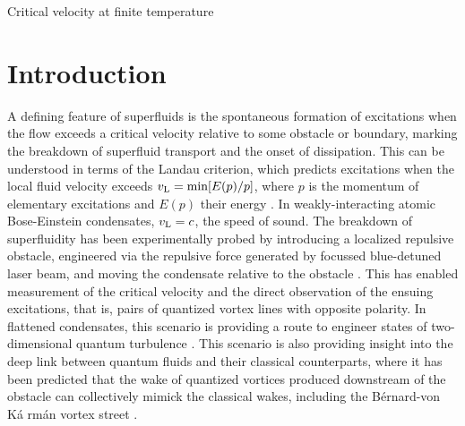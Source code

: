 \begin{chapter}{\label{cha:nonequib}Critical velocity at finite temperature}
  \section{Introduction}
A defining feature of superfluids is the spontaneous formation of excitations when the flow exceeds a critical velocity relative to some obstacle or boundary, marking the breakdown of superfluid transport and the onset of dissipation.  This can be understood in terms of the Landau criterion, which predicts excitations when the local fluid velocity exceeds $v_{\rm L} = \textrm{min} [E(p)/p]$, where $p$ is the momentum of elementary excitations and $E(p)$ their energy \cite{NozieresPines}.  In weakly-interacting atomic Bose-Einstein condensates,  $v_{\rm L}=c$, the speed of sound.  The breakdown of superfluidity has been experimentally probed by introducing a localized repulsive obstacle, engineered via the repulsive force generated by focussed blue-detuned laser beam, and moving the condensate relative to the obstacle \cite{Neely,kwon_moon_14,kwon_2015a,kwon_2015b,Raman,Onofrio,Inouye,desbuquois_2012}.  This has enabled measurement of the critical velocity and the direct observation of the ensuing excitations, that is, pairs of quantized vortex lines with opposite polarity.  In flattened condensates, this scenario is providing a route to engineer states of two-dimensional quantum turbulence \cite{Neely,kwon_moon_14}.  This scenario is also providing insight into the deep link between quantum fluids and their classical counterparts, where it has been predicted that the wake of quantized vortices produced downstream of the obstacle can collectively mimick the classical wakes, including the B{\' e}rnard-von K{\'a} rm{\' a}n vortex street \cite{saito_2010,stagg_2014}.  




\end{chapter}
